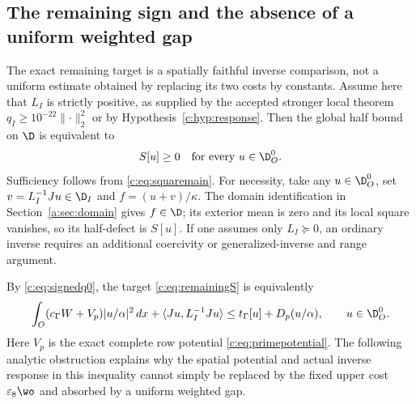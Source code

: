 \documentclass[11pt,a4paper]{article}
\numberwithin{equation}{section}
\theoremstyle{definition}\newtheorem{definition}[theorem]{Definition}
\theoremstyle{remark}\newtheorem{remark}[theorem]{Remark}
\newcommand{\tg}{t_\Gamma}\newcommand{\cg}{c_\Gamma}
\newcommand{\ip}[2]{\langle#1,#2\rangle}\newcommand{\norm}[1]{\lVert#1\rVert}\newcommand{\abs}[1]{\lvert#1\rvert}
\begin{document}
\subsection{The remaining sign and the absence of a uniform weighted gap}\label{c:sec:limits}
The exact remaining target is a spatially faithful inverse comparison, not a uniform estimate obtained by replacing its two costs by constants. Assume here that $L_I$ is strictly positive, as supplied by the accepted stronger local theorem $q_I\ge10^{-22}\norm{\cdot}_2^2$ or by Hypothesis~\ref{c:hyp:response}. Then the global half bound on $\D$ is equivalent to
\begin{equation}\label{c:eq:remainingS}
 S[u]\ge0\quad\hbox{for every }u\in\D_O^0.
\end{equation}
Sufficiency follows from \eqref{c:eq:squaremain}.
For necessity, take any $u\in\D_O^0$, set $v=L_I^{-1}Ju\in\D_I$ and
$f=(u+v)/\kappa$. The domain identification in Section~\ref{a:sec:domain} gives $f\in\D$; its exterior mean is zero and its local square vanishes, so its half-defect is $S[u]$.
If one assumes only $L_I\succeq0$, an ordinary inverse requires an additional coercivity or generalized-inverse and range argument.

By \eqref{c:eq:signedq0}, the target \eqref{c:eq:remainingS} is equivalently
\begin{equation}\label{c:eq:spatialtarget}
 \int_O(\cg W+V_p)|u/\alpha|^2\,dx+\ip{Ju}{L_I^{-1}Ju}
 \le\tg[u]+D_p(u/\alpha),\qquad u\in\D_O^0.
\end{equation}
Here $V_p$ is the exact complete row potential \eqref{c:eq:primepotential}.
The following analytic obstruction explains why the spatial potential and actual inverse response in this inequality cannot simply be replaced by the fixed upper cost $\varepsilon_8\wo$ and absorbed by a uniform weighted gap.
\end{document}
